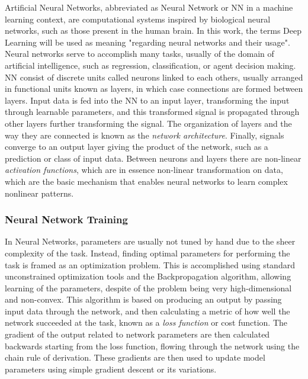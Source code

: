 Artificial Neural Networks, abbreviated as Neural Network or NN in a machine learning context, are computational systems inspired by biological neural networks, such as those present in the human brain. In this work, the terms Deep Learning will be used as meaning "regarding neural networks and their usage". Neural networks serve to accomplish many tasks, usually of the domain of artificial intelligence, such as regression, classification, or agent decision making. NN consist of discrete units called neurons linked to each others, usually arranged in functional units known as layers, in which case connections are formed between layers. Input data is fed into the NN to an input layer, transforming the input through learnable parameters, and this transformed signal is propagated through other layers further transforming the signal. The organization of layers and the way they are connected is known as the \textit{network architecture}. Finally, signals converge to an output layer giving the product of the network, such as a prediction or class of input data. Between neurons and layers there are non-linear \textit{activation functions}, which are in essence non-linear transformation on data, which are the basic mechanism that enables neural networks to learn complex nonlinear patterns.

\subsubsection*{Neural Network Training}

In Neural Networks, parameters are usually not tuned by hand due to the sheer complexity of the task. Instead, finding optimal parameters for performing the task is framed as an optimization problem. This is accomplished using standard unconstrained optimization tools and the Backpropagation algorithm, allowing learning of the parameters, despite of the problem being very high-dimensional and non-convex. This algorithm is based on producing an output by passing input data through the network, and then calculating a metric of how well the network succeeded at the task, known as a \textit{loss function} or cost function. The gradient of the output related to network parameters are then calculated backwards starting from the loss function, flowing through the network using the chain rule of derivation. These gradients are then used to update model parameters using simple gradient descent or its variations. 


